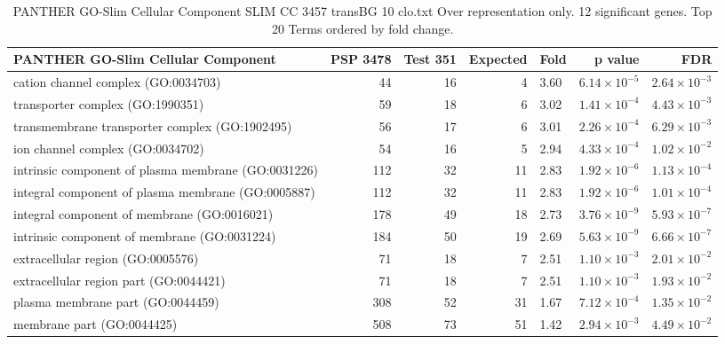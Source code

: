 \begin{table}[ht]
\centering
\begin{adjustbox}{width=\textwidth}
\begin{tabular}{lrrrlrr}
  \hline
PANTHER GO-Slim Cellular Component & PSP 3478 & Test 351 & Expected & Fold & p value & FDR \\ 
  \hline
cation channel complex (GO:0034703) & 44 & 16 & 4 & 3.60 & $6.14 \times 10^{-5}$ & $2.64 \times 10^{-3}$ \\ 
  transporter complex (GO:1990351) & 59 & 18 & 6 & 3.02 & $1.41 \times 10^{-4}$ & $4.43 \times 10^{-3}$ \\ 
  transmembrane transporter complex (GO:1902495) & 56 & 17 & 6 & 3.01 & $2.26 \times 10^{-4}$ & $6.29 \times 10^{-3}$ \\ 
  ion channel complex (GO:0034702) & 54 & 16 & 5 & 2.94 & $4.33 \times 10^{-4}$ & $1.02 \times 10^{-2}$ \\ 
  intrinsic component of plasma membrane (GO:0031226) & 112 & 32 & 11 & 2.83 & $1.92 \times 10^{-6}$ & $1.13 \times 10^{-4}$ \\ 
  integral component of plasma membrane (GO:0005887) & 112 & 32 & 11 & 2.83 & $1.92 \times 10^{-6}$ & $1.01 \times 10^{-4}$ \\ 
  integral component of membrane (GO:0016021) & 178 & 49 & 18 & 2.73 & $3.76 \times 10^{-9}$ & $5.93 \times 10^{-7}$ \\ 
  intrinsic component of membrane (GO:0031224) & 184 & 50 & 19 & 2.69 & $5.63 \times 10^{-9}$ & $6.66 \times 10^{-7}$ \\ 
  extracellular region (GO:0005576) & 71 & 18 & 7 & 2.51 & $1.10 \times 10^{-3}$ & $2.01 \times 10^{-2}$ \\ 
  extracellular region part (GO:0044421) & 71 & 18 & 7 & 2.51 & $1.10 \times 10^{-3}$ & $1.93 \times 10^{-2}$ \\ 
  plasma membrane part (GO:0044459) & 308 & 52 & 31 & 1.67 & $7.12 \times 10^{-4}$ & $1.35 \times 10^{-2}$ \\ 
  membrane part (GO:0044425) & 508 & 73 & 51 & 1.42 & $2.94 \times 10^{-3}$ & $4.49 \times 10^{-2}$ \\ 
   \hline
\end{tabular}
\end{adjustbox}
\caption{PANTHER GO-Slim Cellular Component SLIM CC 3457 transBG 10 clo.txt Over representation only. 12 significant genes. Top 20 Terms ordered by fold change. } 
\label{tab:PANTHER GO-Slim Cellular Component SLIM CC 3457 transBG 10 clo.txt Over representation only. 12 significant genes. Top 20 Terms ordered by fold change. }
\end{table}

